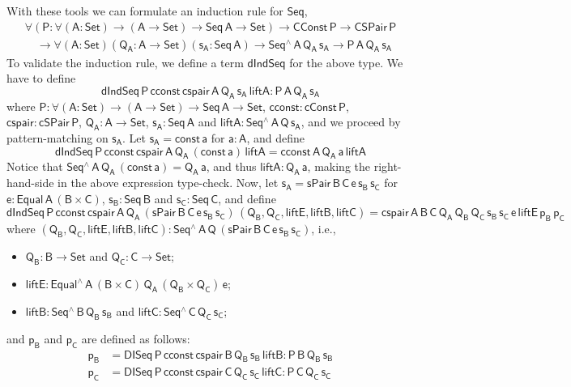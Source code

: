 \documentclass[9pt]{entcs}
\begin{document}
With these tools we can formulate an induction rule for $\mathsf{Seq}$,
\[
\begin{array}{l}
\mathsf{\forall (P : \forall (A : Set) \to (A \to Set) \to Seq\,A \to Set)}
\mathsf{\to CConst\,P \to CSPair\,P} \\
\quad \mathsf{\to \forall (A : Set)(Q_A : A \to Set)(s_A : Seq\,A) \to Seq^{\wedge}\,A\,Q_A\,s_A \to P\,A\,Q_A\,s_A}
\end{array}
\]
To validate the induction rule, we define a term $\mathsf{dIndSeq}$ for the above type.
We have to define
\[
\mathsf{dIndSeq\,P\,cconst\,cspair\,A\,Q_A\,s_A\,liftA : P\,A\,Q_A\,s_A}
\]
where
$\mathsf{P : \forall (A : Set) \to (A \to Set) \to Seq\,A \to Set}$,
$\mathsf{cconst : cConst\,P}$,
$\mathsf{cspair : cSPair\,P}$,
$\mathsf{Q_A : A \to Set}$, $\mathsf{s_A : Seq\,A}$
and $\mathsf{liftA : Seq^{\wedge}\,A\,Q\,s_A}$,
and we proceed by pattern-matching on $\mathsf{s_A}$.
Let $\mathsf{s_A = const\,a}$ for $\mathsf{a : A}$, and define
\[
\mathsf{dIndSeq\,P\,cconst\,cspair\,A\,Q_A\,(const\,a)\,liftA = cconst\,A\,Q_A\,a\,liftA}
\]
Notice that $\mathsf{Seq^{\wedge}\,A\,Q_A\,(const\,a) = Q_A\,a}$, and thus $\mathsf{liftA : Q_A\,a}$,
making the right-hand-side in the above expression type-check.
Now, let $\mathsf{s_A = sPair\,B\,C\,e\,s_B\,s_C}$
for $\mathsf{e : Equal\,A\,(B \times C)}$, $\mathsf{s_B : Seq\,B}$ and $\mathsf{s_C : Seq\,C}$,
and define
\[
\mathsf{dIndSeq\,P\,cconst\,cspair\,A\,Q_A\,(sPair\,B\,C\,e\,s_B\,s_C)\,(Q_B, Q_C, liftE, liftB, liftC)
	= cspair\,A\,B\,C\,Q_A\,Q_B\,Q_C\,s_B\,s_C\,e\,liftE\,p_B\,p_C}
\]
where $\mathsf{(Q_B, Q_C, liftE, liftB, liftC) : Seq^{\wedge}\,A\,Q\,(sPair\,B\,C\,e\,s_B\,s_C)}$, i.e.,
\begin{itemize}
\item $\mathsf{Q_B : B \to Set}$ and $\mathsf{Q_C : C \to Set}$;
\item $\mathsf{liftE : Equal^{\wedge}\,A\, (B \times C)\, Q_A\, (Q_B \times Q_C) \, e}$;
\item $\mathsf{liftB : Seq^{\wedge}\,B\,Q_B\,s_B}$ and $\mathsf{liftC : Seq^{\wedge}\,C\,Q_C\,s_C}$;
\end{itemize}
and $\mathsf{p_B}$ and $\mathsf{p_C}$ are defined as follows:
\begin{align*}
\mathsf{p_B} &=\mathsf{DISeq\,P\,cconst\,cspair\,B\,Q_B\,s_B\,liftB : P\,B\,Q_B\,s_B} \\
\mathsf{p_C} &=\mathsf{DISeq\,P\,cconst\,cspair\,C\,Q_C\,s_C\,liftC : P\,C\,Q_C\,s_C}
\end{align*}
\end{document}
